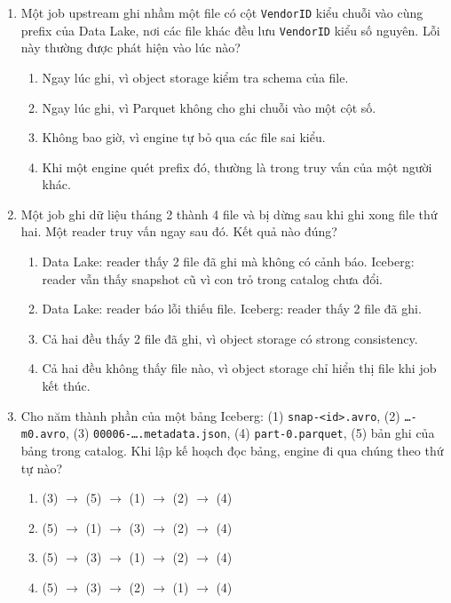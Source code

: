 \documentclass[12pt]{article}
\begin{document}
\begin{enumerate}[label=\textbf{\arabic*.}, leftmargin=1.6em, itemsep=1.2em]
\item Một job upstream ghi nhầm một file có cột \texttt{VendorID} kiểu chuỗi vào cùng prefix của Data Lake, nơi các file khác đều lưu \texttt{VendorID} kiểu số nguyên. Lỗi này thường được phát hiện vào lúc nào?

\begin{enumerate}[label=\alph*), leftmargin=2.2em, itemsep=1pt]
    \item Ngay lúc ghi, vì object storage kiểm tra schema của file.
    \item Ngay lúc ghi, vì Parquet không cho ghi chuỗi vào một cột số.
    \item Không bao giờ, vì engine tự bỏ qua các file sai kiểu.
    \item Khi một engine quét prefix đó, thường là trong truy vấn của một người khác.
\end{enumerate}

\item Một job ghi dữ liệu tháng 2 thành 4 file và bị dừng sau khi ghi xong file thứ hai. Một reader truy vấn ngay sau đó. Kết quả nào đúng?

\begin{enumerate}[label=\alph*), leftmargin=2.2em, itemsep=1pt]
    \item Data Lake: reader thấy 2 file đã ghi mà không có cảnh báo. Iceberg: reader vẫn thấy snapshot cũ vì con trỏ trong catalog chưa đổi.
    \item Data Lake: reader báo lỗi thiếu file. Iceberg: reader thấy 2 file đã ghi.
    \item Cả hai đều thấy 2 file đã ghi, vì object storage có strong consistency.
    \item Cả hai đều không thấy file nào, vì object storage chỉ hiển thị file khi job kết thúc.
\end{enumerate}

\item Cho năm thành phần của một bảng Iceberg: (1) \texttt{snap-<id>.avro}, (2) \texttt{\dots-m0.avro}, (3) \texttt{00006-\dots.metadata.json}, (4) \texttt{part-0.parquet}, (5) bản ghi của bảng trong catalog. Khi lập kế hoạch đọc bảng, engine đi qua chúng theo thứ tự nào?

\begin{enumerate}[label=\alph*), leftmargin=2.2em, itemsep=1pt]
    \item (3) $\rightarrow$ (5) $\rightarrow$ (1) $\rightarrow$ (2) $\rightarrow$ (4)
    \item (5) $\rightarrow$ (1) $\rightarrow$ (3) $\rightarrow$ (2) $\rightarrow$ (4)
    \item (5) $\rightarrow$ (3) $\rightarrow$ (1) $\rightarrow$ (2) $\rightarrow$ (4)
    \item (5) $\rightarrow$ (3) $\rightarrow$ (2) $\rightarrow$ (1) $\rightarrow$ (4)
\end{enumerate}


\end{enumerate}
\end{document}
